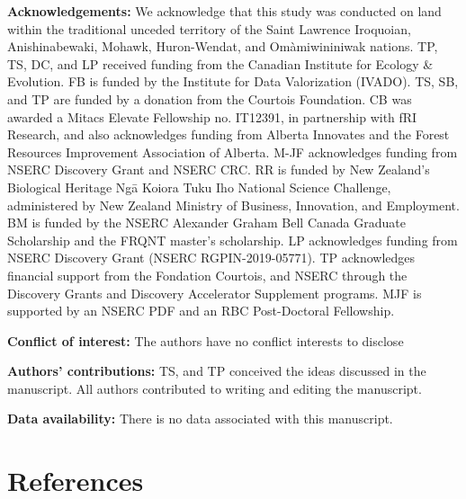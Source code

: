 \documentclass[11pt]{article}
\begin{document}
\textbf{Acknowledgements:} We acknowledge that this study was conducted
on land within the traditional unceded territory of the Saint Lawrence
Iroquoian, Anishinabewaki, Mohawk, Huron-Wendat, and Omàmiwininiwak
nations. TP, TS, DC, and LP received funding from the Canadian Institute
for Ecology \& Evolution. FB is funded by the Institute for Data
Valorization (IVADO). TS, SB, and TP are funded by a donation from the
Courtois Foundation. CB was awarded a Mitacs Elevate Fellowship no.
IT12391, in partnership with fRI Research, and also acknowledges funding
from Alberta Innovates and the Forest Resources Improvement Association
of Alberta. M-JF acknowledges funding from NSERC Discovery Grant and
NSERC CRC. RR is funded by New Zealand's Biological Heritage Ngā Koiora
Tuku Iho National Science Challenge, administered by New Zealand
Ministry of Business, Innovation, and Employment. BM is funded by the
NSERC Alexander Graham Bell Canada Graduate Scholarship and the FRQNT
master's scholarship. LP acknowledges funding from NSERC Discovery Grant
(NSERC RGPIN-2019-05771). TP acknowledges financial support from the
Fondation Courtois, and NSERC through the Discovery Grants and Discovery
Accelerator Supplement programs. MJF is supported by an NSERC PDF and an
RBC Post-Doctoral Fellowship.

\textbf{Conflict of interest:} The authors have no conflict interests to
disclose

\textbf{Authors' contributions:} TS, and TP conceived the ideas
discussed in the manuscript. All authors contributed to writing and
editing the manuscript.

\textbf{Data availability:} There is no data associated with this
manuscript.

\hypertarget{references}{%
\section*{References}\label{references}}
\end{document}
